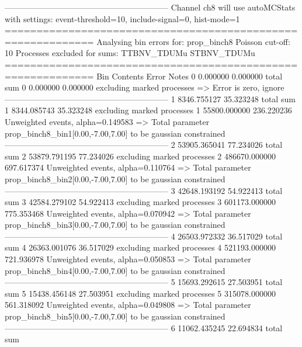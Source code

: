 ------------------------------------------------------------
Channel ch8 will use autoMCStats with settings: event-threshold=10, include-signal=0, hist-mode=1
============================================================
Analysing bin errors for: prop_binch8
Poisson cut-off: 10
Processes excluded for sums: TTBNV_TDUMu STBNV_TDUMu
============================================================
Bin        Contents        Error           Notes                         
0          0.000000        0.000000        total sum                     
0          0.000000        0.000000        excluding marked processes    
  => Error is zero, ignore      
------------------------------------------------------------
1          8346.755127     35.323248       total sum                     
1          8344.085743     35.323248       excluding marked processes    
1          55800.000000    236.220236      Unweighted events, alpha=0.149583
  => Total parameter prop_binch8_bin1[0.00,-7.00,7.00] to be gaussian constrained
------------------------------------------------------------
2          53905.365041    77.234026       total sum                     
2          53879.791195    77.234026       excluding marked processes    
2          486670.000000   697.617374      Unweighted events, alpha=0.110764
  => Total parameter prop_binch8_bin2[0.00,-7.00,7.00] to be gaussian constrained
------------------------------------------------------------
3          42648.193192    54.922413       total sum                     
3          42584.279102    54.922413       excluding marked processes    
3          601173.000000   775.353468      Unweighted events, alpha=0.070942
  => Total parameter prop_binch8_bin3[0.00,-7.00,7.00] to be gaussian constrained
------------------------------------------------------------
4          26503.972332    36.517029       total sum                     
4          26363.001076    36.517029       excluding marked processes    
4          521193.000000   721.936978      Unweighted events, alpha=0.050853
  => Total parameter prop_binch8_bin4[0.00,-7.00,7.00] to be gaussian constrained
------------------------------------------------------------
5          15693.292615    27.503951       total sum                     
5          15438.456148    27.503951       excluding marked processes    
5          315078.000000   561.318092      Unweighted events, alpha=0.049808
  => Total parameter prop_binch8_bin5[0.00,-7.00,7.00] to be gaussian constrained
------------------------------------------------------------
6          11062.435245    22.694834       total sum                     
